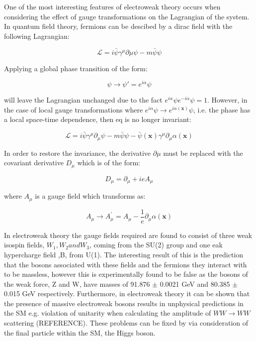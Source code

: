 One of the most interesting features of electroweak theory occurs when considering the effect of gauge transformations on the Lagrangian of the system. In quantum field theory, fermions can be descibed by a dirac field with the following Lagrangian:

\begin{equation}
  \label{eq:diracLagrangian}
\mathscr{L}=i\bar{\psi} \gamma^{\mu} \partial{\mu} \psi  -m\bar{\psi}\psi
\end{equation}

Applying a global phase transition of the form:

\begin{equation}
\psi \rightarrow \psi ' = e^{i\alpha}\psi
\end{equation}

will leave the Lagrangian unchanged due to the fact $e^{i\alpha}\psi e^{-i\alpha}\psi=1$. However, in the case of local gauge transformations where $e^{i\alpha}\psi \rightarrow  e^{i\alpha(\textbf{x})}\psi$, i.e. the phase has a local space-time dependence, then eq is no longer invariant:

\begin{equation}
\mathscr{L}=i\bar{\psi} \gamma^{\mu} \partial{_\mu} \psi  -m\bar{\psi}\psi -\bar{\psi}(\textbf{x})\gamma^{\mu}\partial{_\mu}\alpha(\textbf{x})
\end{equation}

In order to restore the invariance, the derivative $\partial{\mu}$ must be replaced with the covariant derivative $D_{\mu}$ which is of the form:

\begin{equation}
  D_{\mu}=\partial{_\mu}+ieA_{\mu}
\end{equation}

where $A_{\mu}$ is a gauge field which transforms as:

\begin{equation}
  A_{\mu}\rightarrow A_{\mu}^{'} = A_{\mu} - \frac{1}{e}\partial{_\mu}\alpha(\textbf{x})
\end{equation}

In electroweak theory the gauge fields required are found to consist of three weak isospin fields, $W_1, W_2 and W_3$,  coming from the SU(2) group and one eak hypercharge field ,B, from U(1). The interesting result of this is the prediction that the bosons associated with these fields and the fermions they interact with to be massless, however this is experimentally found to be false as the bosons of the weak force, Z and W, have masses of 91.876 $\pm$ 0.0021 GeV and 80.385 $\pm$ 0.015 GeV respectively. Furthermore, in electroweak theory it can be shown that the presence of massive electroweak bosons results in unphysical predictions in the \ac{SM} e.g. violation of unitarity when calculating the amplitude of $WW\rightarrow WW$ scattering (REFERENCE). These problems can be fixed by via consideration of the final particle within the \ac{SM}, the Higgs boson.


